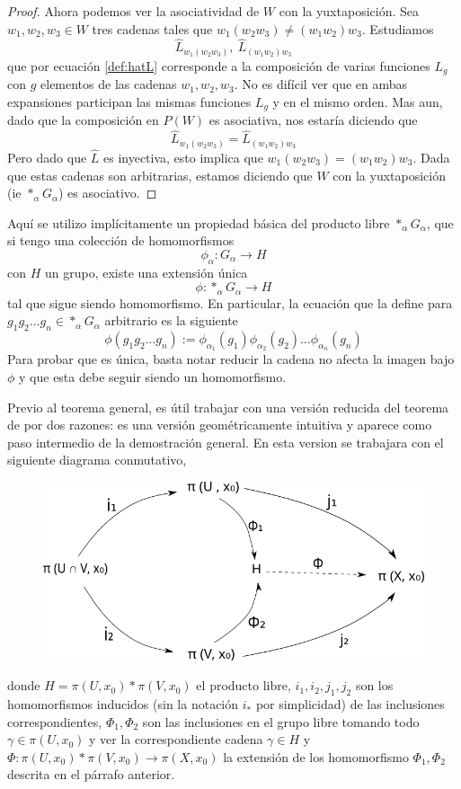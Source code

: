 \begin{proof}
  Ahora podemos ver la asociatividad de \(W\) con la yuxtaposición. Sea
  \(w_1, w_2, w_3 \in W\) tres cadenas tales que \(w_1 (w_2 w_3) \neq
  (w_1 w_2) w_3\). Estudiamos \[\hat L_{w_1 (w_2 w_3)},\ \hat L_{(w_1
    w_2) w_3}\] que por ecuación \eqref{def:hatL} corresponde a la
  composición de varias funciones \(L_g\) con \(g\) elementos de las
  cadenas \(w_1, w_2, w_3\).  No es difícil ver que en ambas expansiones
  participan las mismas funciones \(L_g\) y en el mismo orden. Mas aun,
  dado que la composición en \(P(W)\) es asociativa, nos estaría diciendo
  que
  \[ \hat L_{w_1 (w_2 w_3)} = \hat L_{(w_1 w_2) w_3}\]
  Pero dado que \(\hat L\) es inyectiva, esto implica que \(w_1 (w_2
  w_3) = (w_1 w_2) w_3\). Dada que estas cadenas son arbitrarias,
  estamos diciendo que \(W\) con la yuxtaposición (ie \(*_\alpha
  G_\alpha\)) es asociativo.
\end{proof}

Aquí se utilizo implícitamente un propiedad básica del producto libre
\(*_\alpha G_\alpha\), que si tengo una colección de homomorfismos
\[ \phi_\alpha : G_\alpha \to H \]
con \(H\) un grupo, existe una extensión única
\[ \phi : *_\alpha G_\alpha \to H \]
tal que sigue siendo homomorfismo. En particular, la ecuación que la
define para \(g_1 g_2 \dots g_n \in *_\alpha G_\alpha\) arbitrario es la siguiente
\[
  \phi \left( g_1 g_2 \dots g_n \right) := \phi_{\alpha_1} (g_1)
  \phi_{\alpha_2} (g_2) \dots \phi_{\alpha_n} (g_n)
\]
Para probar que es única, basta notar reducir la cadena no afecta la
imagen bajo \(\phi\) y que esta debe seguir siendo un homomorfismo.

Previo al teorema general, es útil trabajar con una versión reducida del
teorema de \vank por dos razones: es una versión geométricamente
intuitiva y aparece como paso intermedio de la demostración general. En
esta version se trabajara con el siguiente diagrama conmutativo,
\begin{figure}[h]
  \centering
  \includegraphics[scale=0.5]{./imagenes/van.png}
\end{figure}
donde \( H = \pi (U, x_0) * \pi (V, x_0)\) el producto libre, \(i_1,
i_2, j_1, j_2\) son los homomorfismos inducidos (sin la notación \(i_*\)
por simplicidad) de las inclusiones correspondientes, \(\Phi_1, \Phi_2\)
son las inclusiones en el grupo libre tomando todo \(\gamma \in \pi (U,
x_0)\) y ver la correspondiente cadena \(\gamma \in H\) y \(\Phi :
\pi(U, x_0) * \pi (V, x_0) \to \pi (X, x_0)\) la extensión de los
homomorfismo \(\Phi_1, \Phi_2\) descrita en el párrafo anterior.

